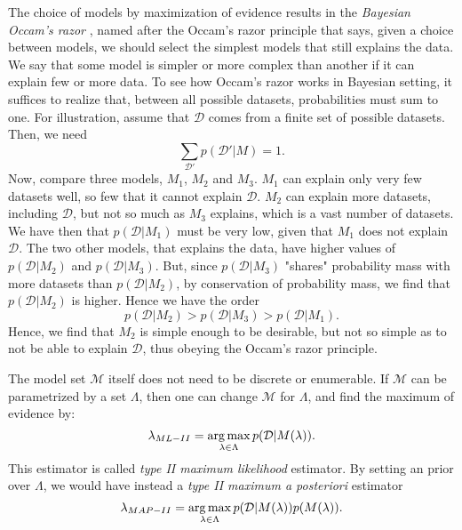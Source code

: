The choice of models by maximization of evidence results in the \textit{Bayesian Occam's razor} \cite{MacKay2003,MacKay_1991,Rasmussen_2001}, named after the Occam's razor principle that says, given a choice between models, we should select the simplest models that still explains the data. We say that some model is simpler or more complex than another if it can explain few or more data. To see how Occam's razor works in Bayesian setting, it suffices to realize that, between all possible datasets, probabilities must sum to one. For illustration, assume that $\mathcal{D}$ comes from a finite set of possible datasets. Then, we need
\begin{equation}
 \sum_{\mathcal{D}'} p(\mathcal{D}'|M) = 1.
\end{equation}
Now, compare three models, $M_1$, $M_2$ and $M_3$. $M_1$ can explain only very few datasets well, so few that it cannot explain $\mathcal{D}$. $M_2$ can explain more datasets, including $\mathcal{D}$, but not so much as $M_3$ explains, which is a vast number of datasets. We have then that $p(\mathcal{D}|M_1)$ must be very low, given that $M_1$ does not explain $\mathcal{D}$. The two other models, that explains the data, have higher values of $p(\mathcal{D}|M_2)$ and $p(\mathcal{D}|M_3)$. But, since $p(\mathcal{D}|M_3)$ "shares" probability mass with more datasets than $p(\mathcal{D}|M_2)$, by conservation of probability mass, we find that $p(\mathcal{D}|M_2)$ is higher. 
Hence we have the order
\begin{equation}
 p(\mathcal{D}|M_2) > p(\mathcal{D}|M_3) > p(\mathcal{D}|M_1).
\end{equation}
Hence, we find that $M_2$ is simple enough to be desirable, but not so simple as to not be able to explain $\mathcal{D}$, thus obeying the Occam's razor principle.

The model set $\mathcal{M}$ itself does not need to be discrete or enumerable. If $\mathcal{M}$ can be parametrized by a set $\Lambda$, then one can change $\mathcal{M}$ for $\Lambda$, and find the maximum of evidence by:
\begin{equation}
 \lambda_{ML-II} = \operatorname*{arg\,max}_{\lambda \in \Lambda} p(\mathcal{D}|M(\lambda)).
\end{equation}
This estimator is called \textit{type II maximum likelihood} estimator. By setting an prior over $\Lambda$, we would have instead a \textit{type II maximum a posteriori} estimator 
\begin{equation}
 \lambda_{MAP-II} = \operatorname*{arg\,max}_{\lambda \in \Lambda} p(\mathcal{D}|M(\lambda)) p(M(\lambda)).
\end{equation}


